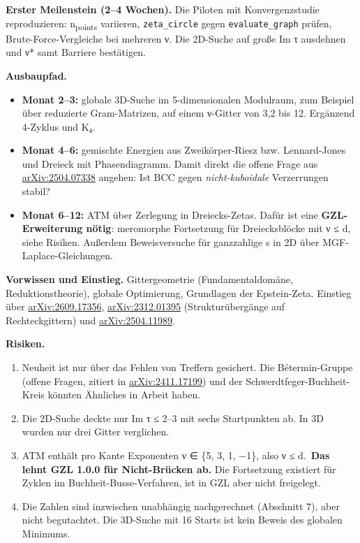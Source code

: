 \textbf{Erster Meilenstein (2--4 Wochen).} Die Piloten mit Konvergenzstudie reproduzieren: n\textsubscript{points} variieren, \texttt{zeta\_circle} gegen \texttt{evaluate\_graph} prüfen, Brute-Force-Vergleiche bei mehreren ν. Die 2D-Suche auf große Im τ ausdehnen und ν* samt Barriere bestätigen.

\textbf{Ausbaupfad.}

\begin{itemize}
\tightlist
\item
  \textbf{Monat 2--3:} globale 3D-Suche im 5-dimensionalen Modulraum, zum Beispiel über reduzierte Gram-Matrizen, auf einem ν-Gitter von 3,2 bis 12. Ergänzend 4-Zyklus und K₄.
\item
  \textbf{Monat 4--6:} gemischte Energien aus Zweikörper-Riesz bzw. Lennard-Jones und Dreieck mit Phasendiagramm. Damit direkt die offene Frage aus \href{https://arxiv.org/abs/2504.07338}{arXiv:2504.07338} angehen: Ist BCC gegen \emph{nicht-kuboidale} Verzerrungen stabil?
\item
  \textbf{Monat 6--12:} ATM über Zerlegung in Dreiecks-Zetas. Dafür ist eine \textbf{GZL-Erweiterung nötig}: meromorphe Fortsetzung für Dreiecksblöcke mit ν ≤ d, siehe Risiken. Außerdem Beweisversuche für ganzzahlige s in 2D über MGF-Laplace-Gleichungen.
\end{itemize}

\textbf{Vorwissen und Einstieg.} Gittergeometrie (Fundamentaldomäne, Reduktionstheorie), globale Optimierung, Grundlagen der Epstein-Zeta. Einstieg über \href{https://arxiv.org/abs/2609.17356}{arXiv:2609.17356}, \href{https://arxiv.org/abs/2312.01395}{arXiv:2312.01395} (Strukturübergänge auf Rechteckgittern) und \href{https://arxiv.org/abs/2504.11989}{arXiv:2504.11989}.

\textbf{Risiken.}

\begin{enumerate}
\def\labelenumi{\arabic{enumi}.}
\tightlist
\item
  Neuheit ist nur über das Fehlen von Treffern gesichert. Die Bétermin-Gruppe (offene Fragen, zitiert in \href{https://arxiv.org/abs/2411.17199}{arXiv:2411.17199}) und der Schwerdtfeger-Buchheit-Kreis könnten Ähnliches in Arbeit haben.
\item
  Die 2D-Suche deckte nur Im τ ≤ 2--3 mit sechs Startpunkten ab. In 3D wurden nur drei Gitter verglichen.
\item
  ATM enthält pro Kante Exponenten ν ∈ \{5, 3, 1, −1\}, also ν ≤ d.~\textbf{Das lehnt GZL 1.0.0 für Nicht-Brücken ab.} Die Fortsetzung existiert für Zyklen im Buchheit-Busse-Verfahren, ist in GZL aber nicht freigelegt.
\item
  Die Zahlen sind inzwischen unabhängig nachgerechnet (Abschnitt 7), aber nicht begutachtet. Die 3D-Suche mit 16 Starts ist kein Beweis des globalen Minimums.
\end{enumerate}

